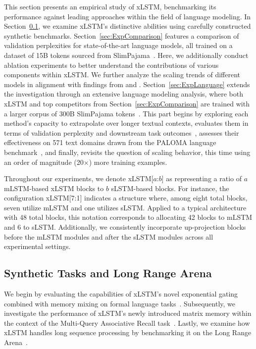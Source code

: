 This section presents an empirical study of xLSTM, benchmarking its performance against leading approaches within the field of language modeling. In Section~\ref{sec:ExpSyntethic}, we examine xLSTM's distinctive abilities using carefully constructed synthetic benchmarks. Section~\ref{sec:ExpComparison} features a comparison of validation perplexities for state-of-the-art language models, all trained on a dataset of 15B tokens sourced from SlimPajama~\citep{Soboleva:23}. Here, we additionally conduct ablation experiments to better understand the contributions of various components within xLSTM. We further analyze the scaling trends of different models in alignment with findings from \citet{Kaplan:20} and \citet{Brown:20short}. Section~\ref{sec:ExpLanguage} extends the investigation through an extensive language modeling analysis, where both xLSTM and top competitors from Section~\ref{sec:ExpComparison} are trained with a larger corpus of 300B SlimPajama tokens~\citep{Soboleva:23}. This part begins by exploring each method’s capacity to extrapolate over longer textual contexts, evaluates them in terms of validation perplexity and downstream task outcomes~\citep{Sutawika:24}, assesses their effectiveness on 571 text domains drawn from the PALOMA language benchmark~\citep{Magnusson:23arxivshort}, and finally, revisits the question of scaling behavior, this time using an order of magnitude (20$\times$) more training examples.

Throughout our experiments, we denote xLSTM[$a$:$b$] as representing a ratio of $a$ mLSTM-based xLSTM blocks to $b$ sLSTM-based blocks. For instance, the configuration xLSTM[7:1] indicates a structure where, among eight total blocks, seven utilize mLSTM and one utilizes sLSTM. Applied to a typical architecture with 48 total blocks, this notation corresponds to allocating 42 blocks to mLSTM and 6 to sLSTM. Additionally, we consistently incorporate up-projection blocks before the mLSTM modules and after the sLSTM modules across all experimental settings.

\subsection{Synthetic Tasks and Long Range Arena}
\label{sec:ExpSyntethic}
We begin by evaluating the capabilities of xLSTM’s novel exponential gating combined with memory mixing on formal language tasks~\citep{Deletang:23}. Subsequently, we investigate the performance of xLSTM’s newly introduced matrix memory within the context of the Multi-Query Associative Recall task~\citep{Arora:23arxiv}. Lastly, we examine how xLSTM handles long sequence processing by benchmarking it on the Long Range Arena~\citep{Tay:21}.

